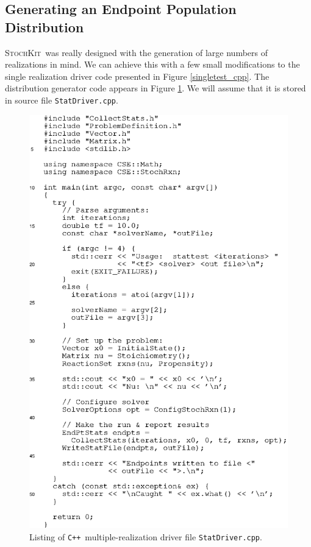 \documentclass[12pt]{article}
\newcommand{\cpp}{\texttt{C++}}%
\newcommand{\api}[1]{\texttt{#1}}
\newcommand{\sspack}{\textsc{StochKit}}
\begin{document}
\subsection{Generating an Endpoint Population Distribution}

\sspack \ was really designed with the generation of large
numbers of realizations in mind.  We can achieve this with a few small
modifications to the single realization driver code presented in
Figure \ref{singletest_cpp}.  The distribution generator code appears
in Figure \ref{stattest_cpp}. We will assume that it is stored in
source file \api{StatDriver.cpp}.
\begin{figure}[htbp]
  \centering \includegraphics{stattest_cpp.eps}
  \caption{Listing of \cpp\ multiple-realization driver file
           \api{StatDriver.cpp}.}
  \label{stattest_cpp}
\end{figure}
\end{document}
